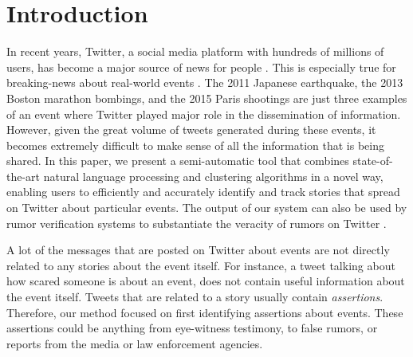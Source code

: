 \documentclass[letterpaper]{article}
\begin{document}
\setlength{\belowcaptionskip}{-7pt}



\section{Introduction}
In recent years, Twitter, a social media platform with hundreds of millions of users, has become a major source of news for people \cite{stassen2010your}. This is especially true for breaking-news about real-world events \cite{kwak2010twitter}. The 2011 Japanese earthquake, the 2013 Boston marathon bombings, and the 2015 Paris shootings are just three examples of an event where Twitter played major role in the dissemination of information. However, given the great volume of tweets generated during these events, it becomes extremely difficult to make sense of all the information that is being shared. In this paper, we present a semi-automatic tool that combines state-of-the-art natural language processing and clustering algorithms in a novel way, enabling users to efficiently and accurately identify and track stories that spread on Twitter about particular events. The output of our system can also be used by rumor verification systems to substantiate the veracity of rumors on Twitter \cite{vosoughi2015automatic}.

A lot of the messages that are posted on Twitter about events are not directly related to any stories about the event itself. For instance, a tweet talking about how scared someone is about an event, does not contain useful information about the event itself. Tweets that are related to a story usually contain \emph{assertions}. Therefore, our method focused on first identifying assertions about events. These assertions could be anything from eye-witness testimony, to false rumors, or reports from the media or law enforcement agencies. %



\end{document}

